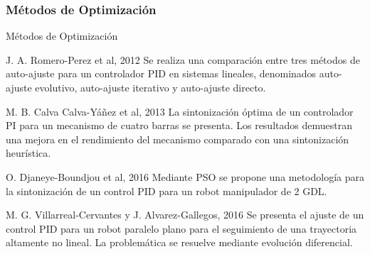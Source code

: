 \subsubsection{Métodos de Optimización}
\begin{frame}[shrink=20]{Métodos de Optimización}
	\begin{block}{J. A. Romero-Perez et al, 2012}
		Se realiza una comparación entre tres métodos de auto-ajuste para un controlador PID en sistemas lineales, denominados auto-ajuste evolutivo, auto-ajuste iterativo y auto-ajuste directo.
	\end{block}
	\begin{block}{M. B. Calva Calva-Yáñez et al, 2013}
		La sintonización óptima de un controlador PI para un mecanismo de cuatro barras se presenta. Los resultados demuestran una mejora en el rendimiento del mecanismo comparado con una sintonización heurística.
	\end{block}
	\begin{block}{O. Djaneye-Boundjou et al, 2016}
		Mediante PSO se propone una metodología para la sintonización de un control PID para un robot manipulador de 2 GDL.
	\end{block}
	\begin{block}{M. G. Villarreal-Cervantes y J. Alvarez-Gallegos, 2016}
		Se presenta el ajuste de un control PID para un robot paralelo plano para el seguimiento de una trayectoria altamente no lineal. La problemática se resuelve mediante evolución diferencial.
	\end{block}
\end{frame}


